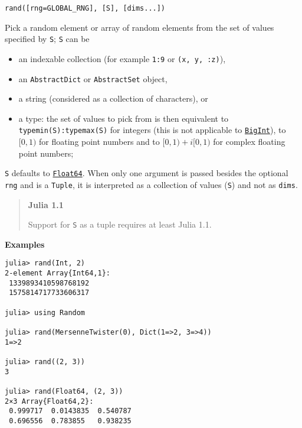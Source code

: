 \begin{adjustwidth}{2em}{0pt}


\begin{verbatim}
rand([rng=GLOBAL_RNG], [S], [dims...])
\end{verbatim}

Pick a random element or array of random elements from the set of values specified by \texttt{S}; \texttt{S} can be

\begin{itemize}
\item an indexable collection (for example \texttt{1:9} or \texttt{({\textquotesingle}x{\textquotesingle}, {\textquotedbl}y{\textquotedbl}, :z)}),


\item an \texttt{AbstractDict} or \texttt{AbstractSet} object,


\item a string (considered as a collection of characters), or


\item a type: the set of values to pick from is then equivalent to \texttt{typemin(S):typemax(S)} for integers (this is not applicable to \hyperlink{423405808990690832}{\texttt{BigInt}}), to  \([0, 1)\)  for floating point numbers and to  \([0, 1)+i[0, 1)\)  for complex floating point numbers;

\end{itemize}
\texttt{S} defaults to \hyperlink{5027751419500983000}{\texttt{Float64}}. When only one argument is passed besides the optional \texttt{rng} and is a \texttt{Tuple}, it is interpreted as a collection of values (\texttt{S}) and not as \texttt{dims}.

\begin{quote}
\textbf{Julia 1.1}

Support for \texttt{S} as a tuple requires at least Julia 1.1.

\end{quote}
\textbf{Examples}


\begin{verbatim}
julia> rand(Int, 2)
2-element Array{Int64,1}:
 1339893410598768192
 1575814717733606317

julia> using Random

julia> rand(MersenneTwister(0), Dict(1=>2, 3=>4))
1=>2

julia> rand((2, 3))
3

julia> rand(Float64, (2, 3))
2×3 Array{Float64,2}:
 0.999717  0.0143835  0.540787
 0.696556  0.783855   0.938235
\end{verbatim}


\end{adjustwidth}
